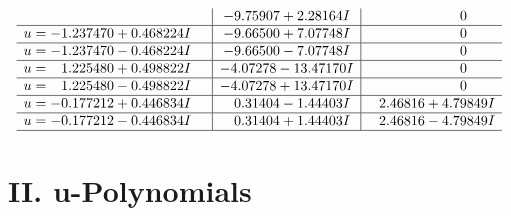 \documentclass[1p]{elsarticle_modified}
\theoremstyle{definition}
\begin{document}
$$\begin{array}{c|c|c}
 & -9.75907 + 2.28164 I & \phantom{-0.000000 } 0 \\ \hline\begin{aligned}
u &= -1.237470 + 0.468224 I\end{aligned}
 & -9.66500 + 7.07748 I & \phantom{-0.000000 } 0 \\ \hline\begin{aligned}
u &= -1.237470 - 0.468224 I\end{aligned}
 & -9.66500 - 7.07748 I & \phantom{-0.000000 } 0 \\ \hline\begin{aligned}
u &= \phantom{-}1.225480 + 0.498822 I\end{aligned}
 & -4.07278 - 13.47170 I & \phantom{-0.000000 } 0 \\ \hline\begin{aligned}
u &= \phantom{-}1.225480 - 0.498822 I\end{aligned}
 & -4.07278 + 13.47170 I & \phantom{-0.000000 } 0 \\ \hline\begin{aligned}
u &= -0.177212 + 0.446834 I\end{aligned}
 & \phantom{-}0.31404 - 1.44403 I & \phantom{-}2.46816 + 4.79849 I \\ \hline\begin{aligned}
u &= -0.177212 - 0.446834 I\end{aligned}
 & \phantom{-}0.31404 + 1.44403 I & \phantom{-}2.46816 - 4.79849 I\\
 \hline 
 \end{array}$$\newpage
\newpage\renewcommand{\arraystretch}{1}
\centering \section*{ II. u-Polynomials}
\end{document}
